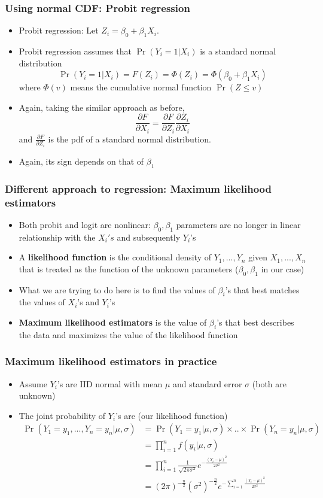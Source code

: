 \documentclass[aspectratio=169]{beamer}
\begin{document}
\begin{frame}
\frametitle{Using normal CDF: Probit regression}
\begin{itemize}
\item Probit regression: Let $Z_i=\beta_0+\beta_1X_i$. 
\item Probit regression assumes that $\Pr(Y_i=1|X_i)$  is a standard normal distribution
\[
\Pr(Y_i=1|X_i)=F(Z_i)=\Phi(Z_i)=\Phi(\beta_0+\beta_1X_i)
\]
where $\Phi(v)$ means the cumulative normal function $\Pr(Z\leq v)$
\item Again, taking the similar approach as before, 
\[
\frac{\partial F}{\partial X_i} = \frac{\partial F}{\partial Z_i}\frac{\partial Z_i}{\partial X_i} 
\]
and $\frac{\partial F}{\partial Z_i}$ is the pdf of a standard normal distribution.
\item Again, its sign depends on that of $\beta_1$
\end{itemize}
\end{frame}

\begin{frame}
\frametitle{Different approach to regression: Maximum likelihood estimators}
\begin{itemize}
\item Both probit and logit are nonlinear: $\beta_0, \beta_1$ parameters are no longer in linear relationship with the $X_i's$ and subsequently $Y_i$'s
\item A \textbf{likelihood function} is the conditional density of $Y_1,...,Y_n$ given $X_1,...,X_n$ that is treated as the function of the unknown parameters ($\beta_0, \beta_1$ in our case)
\item What we are trying to do here is to find the values of $\beta_i$'s that best matches the values of $X_i$'s and $Y_i$'s
\item \textbf{Maximum likelihood estimators} is the value of $\beta_i$'s that best describes the data and maximizes the value of the likelihood function
\end{itemize}
\end{frame}

\begin{frame}
\frametitle{Maximum likelihood estimators in practice}
\begin{itemize}
\item Assume $Y_i$'s are IID normal with mean $\mu$ and standard error $\sigma$ (both are unknown)
\item The joint probability of $Y_i$'s are (our likelihood function)
\[
\begin{aligned}
\Pr(Y_1=y_1,...,Y_n=y_n|\mu,\sigma)&=\Pr(Y_1 = y_1|\mu,\sigma)\times..\times\Pr(Y_n=y_n|\mu,\sigma)\\
&=\prod_{i=1}^nf(y_i|\mu,\sigma)\\
&=\prod_{i=1}^n\frac{1}{\sqrt{2\pi\sigma^2}}e^{-\frac{(Y_i-\mu)^2}{2\sigma^2}}\\
&=(2\pi)^{-\frac{n}{2}} (\sigma^2)^{-\frac{n}{2}}e^{-\sum_{i=1}^n\frac{(Y_i-\mu)^2}{2\sigma^2}}\\
\end{aligned}
\]
\end{itemize}
\end{frame}
\end{document}
